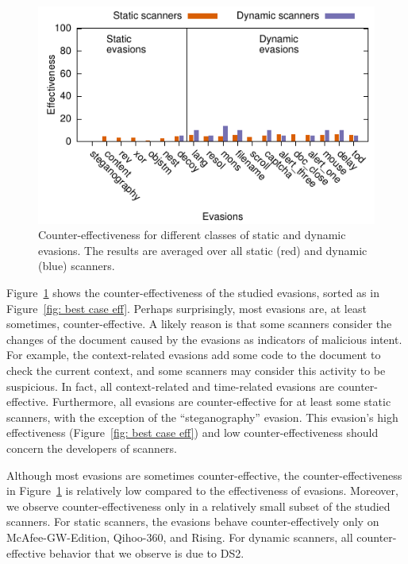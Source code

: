 \begin{figure}[tb]
    \hspace{-.6em}\includegraphics{figures/average-worst-case-counter-eff}
    \caption{Counter-effectiveness for different classes of static and 
    dynamic evasions. The results are averaged over all static
    (red) and dynamic (blue) scanners.}
    \label{fig: worst case counter-eff}
\end{figure}

Figure~\ref{fig: worst case counter-eff} shows the counter-effectiveness of the studied evasions, sorted as in Figure~\ref{fig: best case eff}.
Perhaps surprisingly, most evasions are, at least sometimes, counter-effective.
A likely reason is that some scanners consider the changes of the document caused by the evasions as indicators of malicious intent.
For example, the context-related evasions add some code to the document to check the
current context, and  some scanners may consider this activity to be suspicious.
In fact, all context-related and time-related evasions are counter-effective.
Furthermore, all evasions are counter-effective for at least some static scanners, with the exception of the ``steganography'' evasion.
This evasion's high effectiveness (Figure~\ref{fig: best
  case eff}) and low counter-effectiveness  should concern the developers of scanners.

Although most evasions are sometimes counter-effective, the counter-effectiveness in Figure~\ref{fig: worst case counter-eff} is relatively low compared to the effectiveness of evasions.
Moreover, we observe counter-effectiveness only in a relatively small subset of the studied scanners.
For static scanners, the evasions behave counter-effectively only on McAfee-GW-Edition, Qihoo-360, and Rising.
For dynamic scanners, all counter-effective behavior that we observe is due to DS2.


